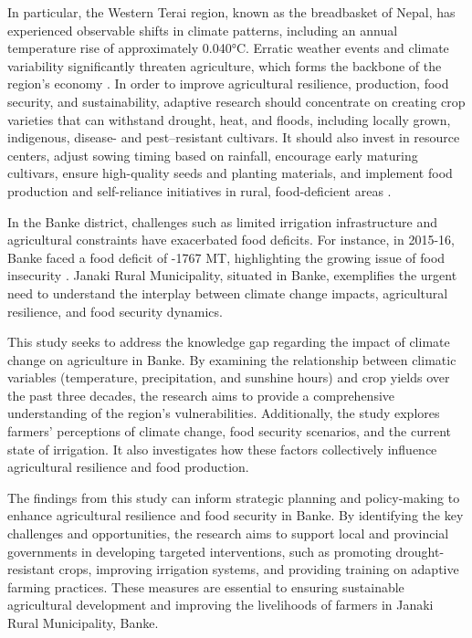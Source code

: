In particular, the Western Terai region, known as the breadbasket of Nepal, has experienced observable shifts in climate patterns, including an annual temperature rise of approximately 0.040°C. Erratic weather events and climate variability significantly threaten agriculture, which forms the backbone of the region's economy \citep{factors_dahal_2021}.  In order to improve agricultural resilience, production, food security, and sustainability, adaptive research should concentrate on creating crop varieties that can withstand drought, heat, and floods, including locally grown, indigenous, disease- and pest--resistant cultivars. It should also invest in resource centers, adjust sowing timing based on rainfall, encourage early maturing cultivars, ensure high-quality seeds and planting materials, and implement food production and self-reliance initiatives in rural, food-deficient areas \citep{khanalFactorsMotivatingFarmers2021}.

In the Banke district, challenges such as limited irrigation infrastructure and agricultural constraints have exacerbated food deficits. For instance, in 2015-16, Banke faced a food deficit of -1767 MT, highlighting the growing issue of food insecurity \citep{gyawaliOverviewAgricultureNepal2021}. Janaki Rural Municipality, situated in Banke, exemplifies the urgent need to understand the interplay between climate change impacts, agricultural resilience, and food security dynamics. 

This study seeks to address the knowledge gap regarding the impact of climate change on agriculture in Banke. By examining the relationship between climatic variables (temperature, precipitation, and sunshine hours) and crop yields over the past three decades, the research aims to provide a comprehensive understanding of the region's vulnerabilities. Additionally, the study explores farmers' perceptions of climate change, food security scenarios, and the current state of irrigation. It also investigates how these factors collectively influence agricultural resilience and food production.

The findings from this study can inform strategic planning and policy-making to enhance agricultural resilience and food security in Banke. By identifying the key challenges and opportunities, the research aims to support local and provincial governments in developing targeted interventions, such as promoting drought-resistant crops, improving irrigation systems, and providing training on adaptive farming practices. These measures are essential to ensuring sustainable agricultural development and improving the livelihoods of farmers in Janaki Rural Municipality, Banke.
